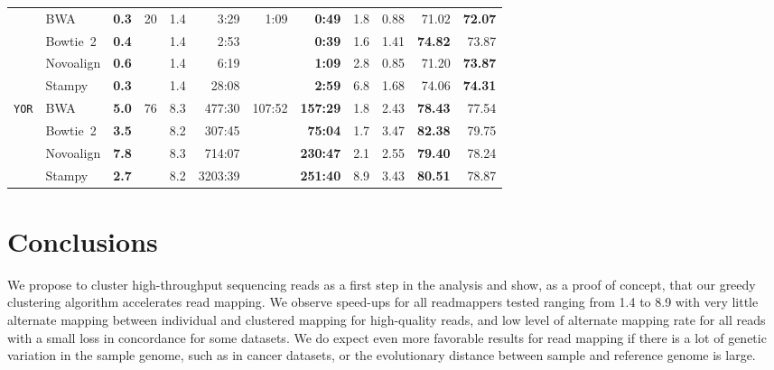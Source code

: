\documentclass[a4paper]{article}
\begin{document}
\begin{table*}
\begin{tabular}{llcrrrrrccrr}
& \multirow{1}{*}{BWA} 		& {\bf 0.3} &\multirow{4}{*}{20}& 1.4 &  3:29 &\multirow{4}{*}{1:09}& {\bf 0:49} & 1.8 & 0.88 & 71.02 & {\bf 72.07}\\
& \multirow{1}{*}{Bowtie~2}	& {\bf 0.4} && 1.4 & 2:53 && {\bf 0:39} & 1.6 & 1.41 & {\bf 74.82} & 73.87\\
& \multirow{1}{*}{Novoalign} 	& {\bf 0.6} && 1.4 & 6:19 && {\bf 1:09} & 2.8 & 0.85 & 71.20 & {\bf 73.87}\\
& \multirow{1}{*}{Stampy}    	& {\bf 0.3} && 1.4 &28:08 && {\bf 2:59} & 6.8 & 1.68 & 74.06 & {\bf 74.31}\\
\hline
\multirow{4}{*}{\tt YOR}
& \multirow{1}{*}{BWA}       	& {\bf 5.0} &\multirow{4}{*}{76}&  8.3 & 477:30 &\multirow{4}{*}{107:52}& {\bf 157:29} & 1.8 & 2.43 & {\bf 78.43} & 77.54\\
& \multirow{1}{*}{Bowtie~2}   	& {\bf 3.5} && 8.2 & 307:45 && {\bf 75:04}  &  1.7 & 3.47 & {\bf 82.38} & 79.75\\
& \multirow{1}{*}{Novoalign} 	& {\bf 7.8} && 8.3 & 714:07 && {\bf 230:47} &  2.1 & 2.55 & {\bf 79.40} & 78.24\\
& \multirow{1}{*}{Stampy}    	& {\bf 2.7} && 8.2 & 3203:39&& {\bf 251:40} &  8.9 & 3.43 & {\bf 80.51} & 78.87\\
\bottomrule
\end{tabular}
\vspace{-5mm}
\end{table*}










\section{Conclusions}
We propose to cluster high-throughput sequencing reads as a first step
in the analysis and show,
as a proof of concept,
that our greedy clustering algorithm
accelerates
read mapping.
We observe speed-ups for all readmappers tested ranging from 1.4 to 8.9
with
very little alternate mapping
between individual and clustered mapping for
high-quality reads, and
low level of alternate mapping rate
for all reads with a small loss
in concordance for some datasets.
We do expect even more favorable results
for
read mapping if there is a lot of genetic variation in the sample
genome, such as in cancer datasets, or the evolutionary distance
between sample and reference genome is large.
\end{document}
